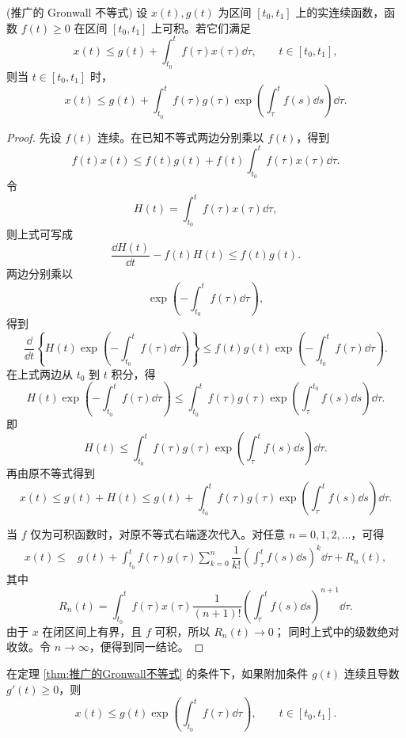 \begin{theorem}(推广的 Gronwall 不等式)\label{thm:推广的Gronwall不等式}
	设 $x(t),g(t)$ 为区间 $[t_0,t_1]$ 上的实连续函数，函数
	$f(t)\geq0$ 在区间 $[t_0,t_1]$ 上可积。若它们满足
	\[
		x(t)\leq g(t)+\int_{t_0}^{t}f(\tau)x(\tau)\dd\tau,
		\qquad t\in[t_0,t_1],
	\]
	则当 $t\in[t_0,t_1]$ 时，
	\[
		x(t)\leq g(t)
		+\int_{t_0}^{t}f(\tau)g(\tau)
		\exp\left(\int_{\tau}^{t}f(s)\dd s\right)\dd\tau.
	\]
\end{theorem}

\begin{proof}
	先设 $f(t)$ 连续。在已知不等式两边分别乘以 $f(t)$，得到
	\[
		f(t)x(t)\leq f(t)g(t)
		+f(t)\int_{t_0}^{t}f(\tau)x(\tau)\dd\tau.
	\]
	令
	\[
		H(t)=\int_{t_0}^{t}f(\tau)x(\tau)\dd\tau,
	\]
	则上式可写成
	\[
		\dfrac{\dd H(t)}{\dd t}-f(t)H(t)\leq f(t)g(t).
	\]
	两边分别乘以
	\[
		\exp\left(-\int_{t_0}^{t}f(\tau)\dd\tau\right),
	\]
	得到
	\[
		\dfrac{\dd}{\dd t}
		\left\{
		H(t)\exp\left(-\int_{t_0}^{t}f(\tau)\dd\tau\right)
		\right\}
		\leq f(t)g(t)
		\exp\left(-\int_{t_0}^{t}f(\tau)\dd\tau\right).
	\]
	在上式两边从 $t_0$ 到 $t$ 积分，得
	\[
		H(t)\exp\left(-\int_{t_0}^{t}f(\tau)\dd\tau\right)
		\leq
		\int_{t_0}^{t}f(\tau)g(\tau)
		\exp\left(\int_{\tau}^{t_0}f(s)\dd s\right)\dd\tau.
	\]
	即
	\[
		H(t)\leq
		\int_{t_0}^{t}f(\tau)g(\tau)
		\exp\left(\int_{\tau}^{t}f(s)\dd s\right)\dd\tau.
	\]
	再由原不等式得到
	\[
		x(t)\leq g(t)+H(t)
		\leq g(t)
		+\int_{t_0}^{t}f(\tau)g(\tau)
		\exp\left(\int_{\tau}^{t}f(s)\dd s\right)\dd\tau.
	\]

	当 $f$ 仅为可积函数时，对原不等式右端逐次代入。对任意
	$n=0,1,2,\ldots$，可得
	\[
	\begin{aligned}
		x(t)\leq{}&g(t)
		+\int_{t_0}^{t}f(\tau)g(\tau)
		\sum_{k=0}^{n}\dfrac{1}{k!}
		\left(\int_{\tau}^{t}f(s)\dd s\right)^k\dd\tau
		+R_n(t),
	\end{aligned}
	\]
	其中
	\[
		R_n(t)=\int_{t_0}^{t}f(\tau)x(\tau)
		\dfrac{1}{(n+1)!}
		\left(\int_{\tau}^{t}f(s)\dd s\right)^{n+1}\dd\tau.
	\]
	由于 $x$ 在闭区间上有界，且 $f$ 可积，所以 $R_n(t)\to0$；
	同时上式中的级数绝对收敛。令 $n\to\infty$，便得到同一结论。
\end{proof}

\begin{corollary}\label{cor:Gronwall单调函数推论}
	在定理 \ref{thm:推广的Gronwall不等式} 的条件下，如果附加条件
	$g(t)$ 连续且导数 $g'(t)\geq0$，则
	\[
		x(t)\leq g(t)
		\exp\left(\int_{t_0}^{t}f(\tau)\dd\tau\right),
		\qquad t\in[t_0,t_1].
	\]
\end{corollary}

